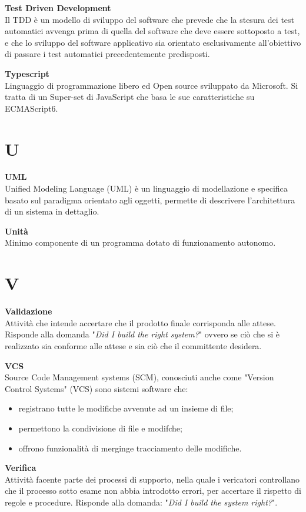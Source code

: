 \documentclass[a4paper, oneside, openany, dvipsnames, table, 12pt]{article}
\begin{document}
\label{par:tdd}
\textbf{Test Driven Development} \\
Il TDD è un modello di sviluppo del software che prevede che la stesura dei test automatici avvenga prima di quella del software che deve essere sottoposto a test, e che lo sviluppo del software applicativo sia orientato esclusivamente all'obiettivo di passare i test automatici precedentemente predisposti.

\textbf{Typescript} \\
Linguaggio di programmazione libero ed Open source sviluppato da Microsoft. Si tratta di un Super-set di JavaScript che basa le sue caratteristiche su ECMAScript6.

\newpage
\section{U}
\textbf{UML} \\
Unified Modeling Language (UML) è un linguaggio di modellazione e specifica basato sul paradigma orientato agli oggetti, permette di descrivere l’architettura di un sistema in dettaglio. 

\textbf{Unità} \\
Minimo componente di un programma dotato di funzionamento autonomo.


\newpage
\section{V}
\textbf{Validazione} \\
Attività che intende accertare che il prodotto finale corrisponda alle attese. Risponde alla domanda "\textit{Did I build the right system?}" ovvero se ciò che si è realizzato sia conforme alle attese e sia ciò che il committente desidera.

\textbf{VCS} \\
Source Code Management systems (SCM), conosciuti anche come "Version Control Systems" (VCS) sono sistemi software che: \begin{itemize}
\item registrano tutte le modifiche avvenute ad un insieme di file;
\item permettono la condivisione di file e modifche;
\item offrono funzionalità di merging\glo e tracciamento delle modifiche.
\end{itemize}

\textbf{Verifica} \\
Attività facente parte dei processi di supporto, nella quale i vericatori controllano che il processo sotto esame non abbia introdotto errori, per accertare il rispetto di regole e procedure. Risponde alla domanda: "\textit{Did I build the system right?}".
\end{document}
